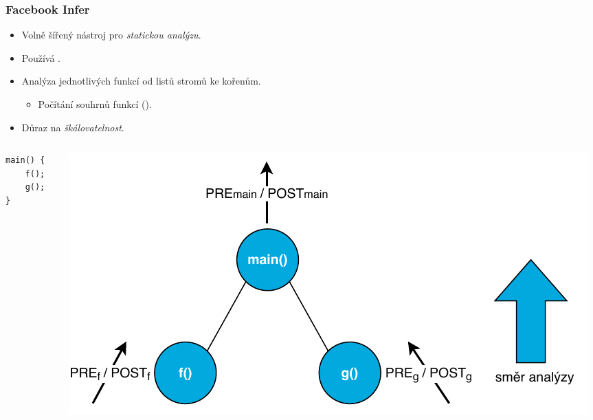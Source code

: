 \documentclass[10pt, xcolor=pdflatex, hyperref={unicode}]{beamer}
\begin{document}
\begin{frame}[fragile]\frametitle{Facebook Infer}
	\begin{itemize}
		\setlength\itemsep{0.5em}

		\item
			Volně šířený nástroj pro \emph{statickou analýzu}.

		\item
			Používá .

		\item
			Analýza jednotlivých funkcí od listů stromů ke kořenům.

			\begin{itemize}
				\setlength\itemsep{0.5em}

				\item
					Počítání souhrnů funkcí ().
			\end{itemize}

		\item
			Důraz na \emph{škálovatelnost}.
	\end{itemize}

	\begin{columns}
		\begin{column}{0.3 \linewidth}
			\centering
			\begin{lstlisting}
main() {
	f();
	g();
}
			\end{lstlisting}
		\end{column}

		\begin{column}{0.7 \linewidth}
			\centering
			\includegraphics[width=1 \linewidth]{img/infer.pdf}
		\end{column}
	\end{columns}
\end{frame}
\end{document}
